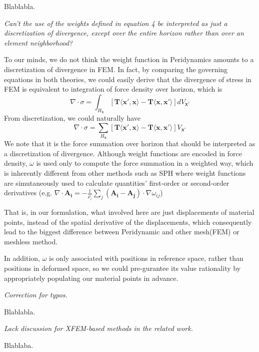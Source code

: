 Blablabla.

\emph{Can't the use of the weights defined in equation 4 be interpreted as just a discretization of divergence, except over the entire horizon rather than over an element neighborhood?}

To our minds, we do not think the weight function in Peridynamics amounts to a discretization of divergence in FEM.
In fact, by comparing the governing equations in both theories, we could easily derive that
the divergence of stress in FEM is equivalent to integration of force density over horizon, which is
\begin{equation}
\nabla\cdot\sigma = \int_{H_\mathbf{x}}[\mathbf{T}\langle\mathbf{x}',\mathbf{x}\rangle - \mathbf{T}\langle\mathbf{x},\mathbf{x}'\rangle]dV_{\mathbf{x}'}
\end{equation}
From discretization, we could naturally have
\begin{equation}
\nabla\cdot\sigma = \sum_{H_\mathbf{x}}[\mathbf{T}\langle\mathbf{x}',\mathbf{x}\rangle - \mathbf{T}\langle\mathbf{x},\mathbf{x}'\rangle]V_{\mathbf{x}'}
\end{equation}
We note that it is the force summation over horizon that should be interpreted as a discretization of divergence.
Although weight functions are encoded in force density, $\omega$ is used only to compute the force summation in a weighted way, which is inherently different from other methods such as SPH where weight functions are simutaneously used to calculate quantities' first-order or second-order derivatives
(e.g. $\nabla\cdot\mathbf{A_i} = -\frac{1}{\rho_i}\sum_j(\mathbf{A_i - A_j})\cdot\nabla\omega_{ij}$)

That is, in our formulation, what involved here are just displacements of material points,
instead of the spatial derivative of the displacements, which consequently lead to the biggest difference between Peridynamic and other mesh(FEM) or meshless method.

In addition, $\omega$ is only associated with positions in reference space, rather than positions in deformed space,
so we could pre-gurantee its value rationality by appropriately populating our material points in advance.

\emph{Correction for typos.}

Blablabla.

\emph{Lack discussion for XFEM-based methods in the related work.}

Blablaba.

